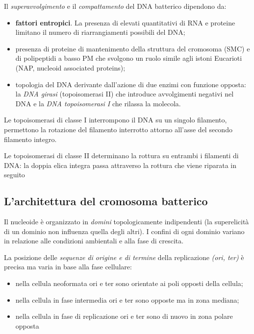 \documentclass[11pt]{book}
\begin{document}
\vspace{1em}
Il \emph{superavvolgimento} e il \emph{compattamento} del DNA batterico dipendono da: 
\begin{itemize}
\item \textbf{fattori entropici}. La presenza di elevati quantitativi di RNA e proteine limitano il numero di riarrangiamenti possibili del DNA;
\item presenza di proteine di mantenimento della struttura del cromosoma (SMC) e di polipeptidi a basso PM che svolgono un ruolo simile agli istoni Eucarioti (NAP, nucleoid associated proteins);
\item topologia del DNA derivante dall’azione di due enzimi con funzione opposta: la \emph{DNA girasi} (topoisomerasi II) che introduce avvolgimenti negativi nel DNA e la \emph{DNA topoisomerasi I} che rilassa la molecola.
\end{itemize}

Le topoisomerasi di classe I interrompono il DNA su un singolo filamento, permettono la rotazione del filamento interrotto attorno all’asse del secondo filamento integro.

Le topoisomerasi di classe II determinano la rottura su entrambi i filamenti di DNA: la doppia elica integra passa attraverso la rottura che viene riparata in seguito 

\subsection{L'architettura del cromosoma batterico}
Il nucleoide è organizzato in \emph{domini} topologicamente indipendenti (la superelicità di un dominio non influenza quella degli altri). I confini di ogni dominio variano in relazione alle condizioni ambientali e alla fase di crescita. 

\vspace{1em}
La posizione delle \emph{sequenze di origine e di termine} della replicazione \emph{(ori, ter)} è precisa ma varia in base alla fase cellulare:
\begin{itemize}
\item nella cellula neoformata ori e ter sono orientate ai poli opposti della cellula;
\item nella cellula in fase intermedia ori e ter sono opposte ma in zona mediana;
\item nella cellula in fase di replicazione ori e ter sono di nuovo in zona polare opposta 
\end{itemize}
\end{document}
